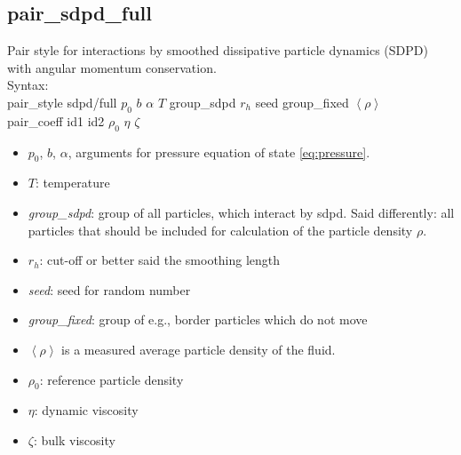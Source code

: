 \documentclass[a4paper,10pt]{scrreprt}
\begin{document}
\subsection{pair\_sdpd\_full}\label{sec:pair/sdpd/full}

Pair style for interactions by smoothed dissipative particle dynamics (SDPD) with angular momentum conservation.
\\[2ex]
Syntax:
\\[1ex]
pair\_style      sdpd/full $p_0$ $b$ $\alpha$ $T$ group\_sdpd $r_h$ seed group\_fixed $\left< \rho \right>$
\\[1ex]
pair\_coeff      id1 id2 $\rho_0$ $\eta$ $\zeta$

\begin{itemize}
\item $p_0$, $b$, $\alpha$, arguments for pressure equation of state \cref{eq:pressure}.
\item $T$: temperature
\item \textit{group\_sdpd}: group of all particles, which interact by sdpd. Said differently: all particles that should be included for calculation of the particle density $\rho$.
\item $r_h$: cut-off or better said the smoothing length
\item \textit{seed}: seed for random number
\item \textit{group\_fixed}: group of e.g., border particles which do not move
\item $\left< \rho \right>$ is a measured average particle density of the fluid.
\item $\rho_0$: reference particle density
\item $\eta$: dynamic viscosity
\item $\zeta$: bulk viscosity
\end{itemize}
\end{document}
